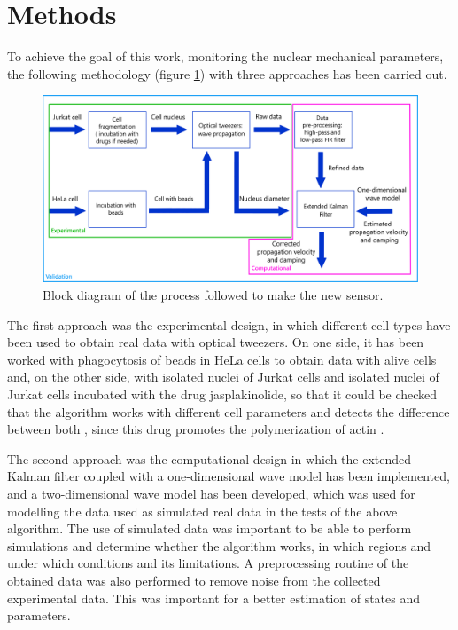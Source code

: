 \documentclass[12pt, a4paper]{article} %
\begin{document}
\setlength{\parskip}{4mm}

\newpage
\setlength{\parskip}{0mm}

\section{Methods}

To achieve the goal of this work, monitoring the nuclear mechanical parameters, the following methodology (figure \ref{fig:esquema_trabajo}) with three approaches has been carried out.

\setlength{\parskip}{4mm}

\begin{figure}[htbp]
  \centering
  \includegraphics[width=1\textwidth]{figures/esquema_trabajo_metodos_2.png}
  \caption{Block diagram of the process followed to make the new sensor.}
  \label{fig:esquema_trabajo}
\end{figure}

The first approach was the experimental design, in which different cell types have been used to obtain real data with optical tweezers. On one side, it has been worked with phagocytosis of beads in HeLa cells \cite{gey1952tissue} to obtain data with alive cells and, on the other side, with isolated nuclei of Jurkat cells \cite{schneider1977characterization, gioia2018genome} and isolated nuclei of Jurkat cells incubated with the drug jasplakinolide, so that it could be checked that the algorithm works with different cell parameters and detects the difference between both \cite{andersen2002directed}, since this drug promotes the polymerization of actin \cite{holzinger2001jasplakinolide}.

The second approach was the computational design in which the extended Kalman filter coupled with a one-dimensional wave model has been implemented, and a two-dimensional wave model has been developed, which was used for modelling the data used as simulated real data in the tests of the above algorithm.  The use of simulated data was important to be able to perform simulations and determine whether the algorithm works, in which regions and under which conditions and its limitations. A preprocessing routine of the obtained data was also performed to remove noise from the collected experimental data. This was important for a better estimation of states and parameters.
\end{document}
